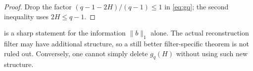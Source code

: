 \begin{proof}
Drop the factor
\((q-1-2H)/(q-1)\le1\) in \eqref{eq:gq}; the second inequality uses
\(2H\le q-1\).
\end{proof}

\begin{remark}
 is a sharp statement for the information
\(\|b\|_1\) alone.  The actual reconstruction filter may have
additional structure, so a still better filter-specific theorem is
not ruled out.  Conversely, one cannot simply delete \(g_q(H)\)
without using such new structure.
\end{remark}
